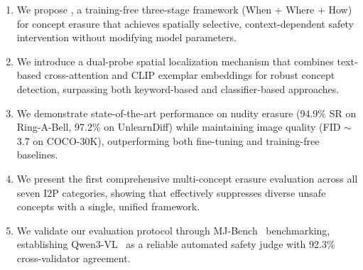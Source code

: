 \begin{enumerate}[leftmargin=1.5em,itemsep=2pt]
    \item We propose \ours{}, a training-free three-stage framework (When + Where + How) for concept erasure that achieves spatially selective, context-dependent safety intervention without modifying model parameters.
    \item We introduce a dual-probe spatial localization mechanism that combines text-based cross-attention and CLIP exemplar embeddings for robust concept detection, surpassing both keyword-based and classifier-based approaches.
    \item We demonstrate state-of-the-art performance on nudity erasure (94.9\% SR on Ring-A-Bell, 97.2\% on UnlearnDiff) while maintaining image quality (FID $\sim$3.7 on COCO-30K), outperforming both fine-tuning and training-free baselines.
    \item We present the first comprehensive multi-concept erasure evaluation across all seven I2P categories, showing that \ours{} effectively suppresses diverse unsafe concepts with a single, unified framework.
    \item We validate our evaluation protocol through MJ-Bench~\citep{chen2025mjbench} benchmarking, establishing Qwen3-VL~\citep{bai2025qwen3vl} as a reliable automated safety judge with 92.3\% cross-validator agreement.
\end{enumerate}
